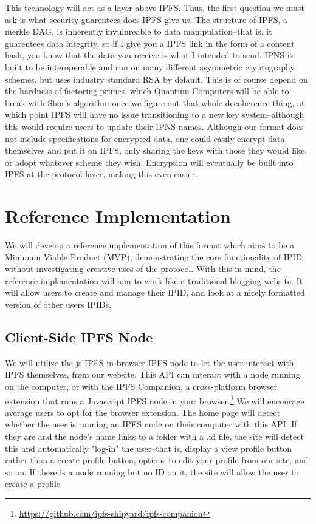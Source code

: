 \documentclass{article}
\begin{document}
This technology will act as a layer above IPFS. Thus, the first question we must ask is what security guarentees does IPFS give us. The structure of IPFS, a merkle DAG, is inherently invulnreable to data manipulation--that is, it guarentees data integrity, so if I give you a IPFS link in the form of a content hash, you know that the data you receive is what I intended to send. IPNS is built to be interoperable and run on many different asymmetric cryptography schemes, but uses industry standard RSA by default. This is of course depend on the hardness of factoring primes, which Quantum Computers will be able to break with Shor's algorithm once we figure out that whole decoherence thing, at which point IPFS will have no issue transitioning to a new key system--although this would require users to update their IPNS names. Although our format does not include specifications for encrypted data, one could easily encrypt data themselves and put it on IPFS, only sharing the keys with those they would like, or adopt whatever scheme they wish. Encryption will eventually be built into IPFS at the protocol layer, making this even easier. 

\section{Reference Implementation}

We will develop a reference implementation of this format which aims to be a Minimum Viable Product (MVP), demonstrating the core functionality of IPID without investigating creative uses of the protocol. With this in mind, the reference implementation will aim to work like a traditional blogging website. It will allow users to create and manage their IPID, and look at a nicely formatted version of other users IPIDs. 

\subsection{Client-Side IPFS Node}

We will utilize the js-IPFS in-browser IPFS node to let the user interact with IPFS themselves, from our website. This API can interact with a node running on the computer, or with the IPFS Companion, a cross-platform browser extension that runs a Javascript IPFS node in your browser.\footnote{\url{https://github.com/ipfs-shipyard/ipfs-companion}} We will encourage average users to opt for the browser extension. The home page will detect whether the user is running an IPFS node on their computer with this API. If they are and the node's name links to a folder with a .id file, the site will detect this and automatically "log-in" the user--that is, display a view profile button rather than a create profile button, options to edit your profile from our site, and so on. If there is a node running but no ID on it, the site will allow the user to create a profile 
\end{document}
